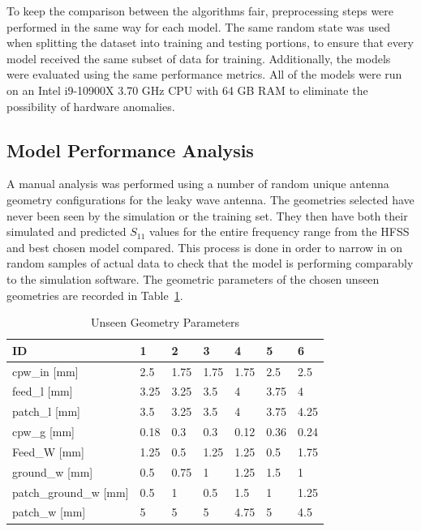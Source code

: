 \documentclass[conference]{IEEEtran}
\begin{document}
To keep the comparison between the algorithms fair, preprocessing steps were performed in the same way for each model. The same random state was used when splitting the dataset into training and testing portions, to ensure that every model received the same subset of data for training. Additionally, the models were evaluated using the same performance metrics. All of the models were run on an Intel i9-10900X 3.70 GHz CPU with 64 GB RAM to eliminate the possibility of hardware anomalies.


\subsection{Model Performance Analysis}
A manual analysis was performed using a number of random unique antenna geometry configurations for the leaky wave antenna. The geometries selected have never been seen by the simulation or the training set. They then have both their simulated and predicted $S_{11}$ values for the entire frequency range from the HFSS and best chosen model compared. This process is done in order to narrow in on random samples of actual data to check that the model is performing comparably to the simulation software. The geometric parameters of the chosen unseen geometries are recorded in Table~\ref{unseen_geometries}.

\begin{table}[h]
\caption{Unseen Geometry Parameters}
\begin{center}
\begin{tabular}{ |l|l|l|l|l|l|l| }
    \hline
    ID & 1 & 2 & 3 & 4 & 5 & 6 \\
    \hline
    cpw\_in [mm] & 2.5 & 1.75 & 1.75 & 1.75 & 2.5 & 2.5 \\
    \hline
    feed\_l [mm] & 3.25 & 3.25 & 3.5 & 4 & 3.75 & 4 \\
    \hline
    patch\_l [mm] & 3.5 & 3.25 & 3.5 & 4 & 3.75 & 4.25 \\
    \hline
    cpw\_g [mm] & 0.18 & 0.3 & 0.3 & 0.12 & 0.36 & 0.24 \\
    \hline
    Feed\_W [mm] & 1.25 & 0.5 & 1.25 & 1.25 & 0.5 & 1.75 \\
    \hline
    ground\_w [mm] & 0.5 & 0.75 & 1 & 1.25 & 1.5 & 1 \\
    \hline
    patch\_ground\_w [mm] & 0.5 & 1 & 0.5 & 1.5 & 1 & 1.25 \\
    \hline
    patch\_w [mm] & 5 & 5 & 5 & 4.75 & 5 & 4.5 \\
    \hline
\end{tabular}
\end{center}
\label{unseen_geometries}
\end{table}    
\end{document}
